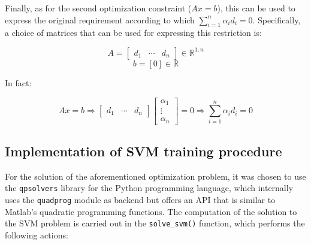 \documentclass[letterpaper,headings=standardclasses]{scrartcl}
\begin{document}
Finally, as for the second optimization constraint ($Ax = b$), this can be used to express the original requirement according to which $\sum_{i = 1}^n \alpha_i d_i = 0$. Specifically, a choice of matrices that can be used for expressing this restriction is:

$$ A = \left[ \begin{matrix} d_1 & \cdots & d_n \end{matrix} \right] \in \mathbb{R}^{1,n} $$
$$ b = [0] \in \mathbb{R} $$

In fact:

$$ Ax = b \Rightarrow \left[ \begin{matrix} d_1 & \cdots & d_n \end{matrix} \right] \left[ \begin{matrix} \alpha_1 \\ \vdots \\ \alpha_n \end{matrix} \right] = 0 \Rightarrow \sum_{i = 1}^n \alpha_i d_i = 0 $$

\subsection{Implementation of SVM training procedure}

For the solution of the aforementioned optimization problem, it was chosen to use the \texttt{qpsolvers} library for the Python programming language, which internally uses the \texttt{quadprog} module as backend but offers an API that is similar to Matlab's quadratic programming functions. The computation of the solution to the SVM problem is carried out in the \texttt{solve\_svm()} function, which performs the following actions:
\end{document}
